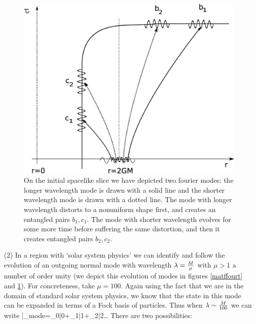 \documentclass[12pt]{article}
\begin{document}
\begin{figure}[tp]
\centerline{\includegraphics[scale=.17]{matftthree.eps}}
%
%
\caption{On the initial spacelike slice we have depicted two fourier modes: the longer wavelength mode is drawn with a solid line and the shorter wavelength mode is drawn with a dotted line. The mode with longer wavelength distorts to a nonuniform shape first, and creates an entangled pairs $b_1, c_1$. The mode with shorter wavelength evolves for some more time before suffering the same distortion, and then it creates  entangled pairs $b_2, c_2$.}
\label{matftthree}       %
\end{figure}

(2)  In a region with `solar system physics' we can identify and follow the evolution of an outgoing normal mode with wavelength $\lambda={M\over \mu}$ with $\mu>1$ a number of order unity (we depict this evolution of modes in figures \ref{matffourt} and \ref{matftthree}). For concreteness, take $\mu=100$. Again using the fact that we are in the domain of standard solar system physics, we know that the state in this mode can be expanded in terms of  a Fock basis of particles. Thus when   $\lambda\sim {M\over 100}$ we can write
\be
|\psi\rangle_{mode}=\alpha_0|0\rangle+\alpha_1|1\rangle+\alpha_2|2\rangle\dots
\ee
There are two possibilities:
\end{document}
